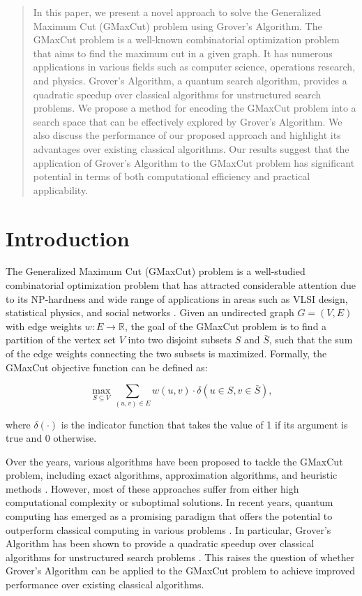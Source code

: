 \begin{abstract}
In this paper, we present a novel approach to solve the Generalized Maximum Cut (GMaxCut) problem using Grover's Algorithm. The GMaxCut problem is a well-known combinatorial optimization problem that aims to find the maximum cut in a given graph. It has numerous applications in various fields such as computer science, operations research, and physics. Grover's Algorithm, a quantum search algorithm, provides a quadratic speedup over classical algorithms for unstructured search problems. We propose a method for encoding the GMaxCut problem into a search space that can be effectively explored by Grover's Algorithm. We also discuss the performance of our proposed approach and highlight its advantages over existing classical algorithms. Our results suggest that the application of Grover's Algorithm to the GMaxCut problem has significant potential in terms of both computational efficiency and practical applicability.

\end{abstract}

\section{Introduction}

The Generalized Maximum Cut (GMaxCut) problem is a well-studied combinatorial optimization problem that has attracted considerable attention due to its NP-hardness and wide range of applications in areas such as VLSI design, statistical physics, and social networks \cite{goemans1995improved,barahona1982computational}. Given an undirected graph $G = (V, E)$ with edge weights $w: E \rightarrow \mathbb{R}$, the goal of the GMaxCut problem is to find a partition of the vertex set $V$ into two disjoint subsets $S$ and $\bar{S}$, such that the sum of the edge weights connecting the two subsets is maximized. Formally, the GMaxCut objective function can be defined as:

\begin{equation}
\max_{S \subseteq V} \sum_{(u, v) \in E} w(u, v) \cdot \delta(u \in S, v \in \bar{S}),
\end{equation}

where $\delta(\cdot)$ is the indicator function that takes the value of 1 if its argument is true and 0 otherwise.

Over the years, various algorithms have been proposed to tackle the GMaxCut problem, including exact algorithms, approximation algorithms, and heuristic methods \cite{barahona1988application,goemans1995improved,karpinski1999polynomial}. However, most of these approaches suffer from either high computational complexity or suboptimal solutions. In recent years, quantum computing has emerged as a promising paradigm that offers the potential to outperform classical computing in various problems \cite{nielsen2000quantum}. In particular, Grover's Algorithm has been shown to provide a quadratic speedup over classical algorithms for unstructured search problems \cite{grover1996fast}. This raises the question of whether Grover's Algorithm can be applied to the GMaxCut problem to achieve improved performance over existing classical algorithms.

